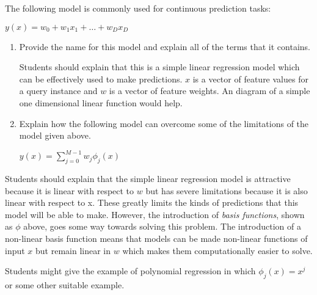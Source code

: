 \documentclass[nosolution]{ditpaper}
\begin{document}
\clearpage


\question 
	\begin{enumerate}
\question The following model is commonly used for continuous prediction tasks:

\begin{center}
$y(x)=w_0 + w_1x_1 + \dots + w_Dx_D$
\end{center}

\begin{enumerate}
\item Provide the name for this model and explain all of the terms that it contains.

		\begin{answer}
		Students should explain that this is a simple linear regression model which can be effectively used to make predictions. $x$ is a vector of feature values for a query instance and $w$ is a vector of feature weights. An diagram of a simple one dimensional linear function would help.
		\end{answer}
				
\item Explain how the following model can overcome some of the limitations of the model given above. 

\begin{center}
$\displaystyle y(x)=\sum_{j=0}^{M - 1}w_j{\phi}_j(x)$
\end{center}
\end{enumerate} 

		\begin{answer}
		Students should explain that the simple linear regression model is attractive because it is linear with respect to $w$ but has severe limitations because it is also linear with respect to x. These greatly limits the kinds of predictions that this model will be able to make. However, the introduction of \emph{basis functions}, shown as $\phi$ above, goes some way towards solving this problem. The introduction of a non-linear basis function means that models can be made non-linear functions of input $x$ but remain linear in $w$ which makes them computationally easier to solve.
		
		Students might give the example of polynomial regression in which ${\phi}_j(x)=x^j$ or some other suitable example.
		\end{answer}
		



\end{enumerate}
\end{document}
